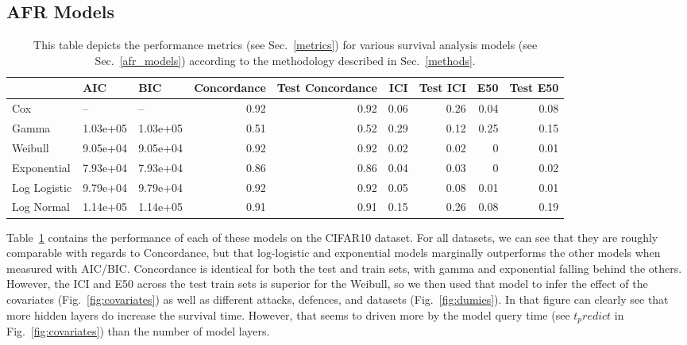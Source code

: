 \subsection{AFR Models}

\begin{table}
\centering
\begin{tabular}{lllrrrrrr}
\toprule
 & AIC & BIC & Concordance & Test Concordance & ICI & Test ICI & E50 & Test E50 \\
\midrule
Cox & -- & -- & 0.92 & 0.92 & 0.06 & 0.26 & 0.04 & 0.08 \\
Gamma & 1.03e+05 & 1.03e+05 & 0.51 & 0.52 & 0.29 & 0.12 & 0.25 & 0.15 \\
Weibull & 9.05e+04 & 9.05e+04 & 0.92 & 0.92 & 0.02 & 0.02 & 0 & 0.01 \\
Exponential & 7.93e+04 & 7.93e+04 & 0.86 & 0.86 & 0.04 & 0.03 & 0 & 0.02 \\
Log Logistic & 9.79e+04 & 9.79e+04 & 0.92 & 0.92 & 0.05 & 0.08 & 0.01 & 0.01 \\
Log Normal & 1.14e+05 & 1.14e+05 & 0.91 & 0.91 & 0.15 & 0.26 & 0.08 & 0.19 \\
\bottomrule
\end{tabular}
\caption{This table depicts the performance metrics (see Sec.~\ref{metrics}) for various survival analysis models (see Sec.~\ref{afr_models}) according to the methodology described in Sec.~\ref{methods}.}
\label{tab:afr_models}
\end{table}

Table~\ref{tab:afr_models} contains the performance of each of these models on the CIFAR10 dataset. For all datasets, we can see that they are roughly comparable with regards to Concordance, but that log-logistic and exponential models marginally outperforms the other models when measured with AIC/BIC. Concordance is identical for both the test and train sets, with gamma and exponential falling behind the others. However, the ICI and E50 across the test train sets is superior for the Weibull, so we then used that model to infer the effect of the covariates (Fig.~\ref{fig:covariates}) as well as different attacks, defences, and datasets (Fig.~\ref{fig:dumies}). In that figure can clearly see that more hidden layers do increase the survival time. However, that seems to driven more by the model query time (see $t_predict$ in Fig.~\ref{fig:covariates}) than the number of model layers.

